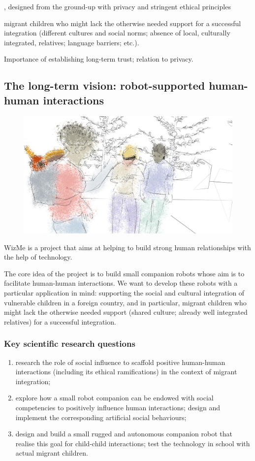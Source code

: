 \documentclass[]{article}
\newcommand{\project}{WizMe\xspace}
\begin{document}
, designed from the
ground-up with privacy and stringent ethical principles

migrant children who might lack the otherwise needed support for a successful
integration (different cultures and social norms; absence of local, culturally
integrated, relatives; language barriers; etc.).


Importance of establishing long-term trust; relation to privacy.


\subsection{The long-term vision: robot-supported human-human interactions}


\begin{figure}[!htbp]
    \centering
    \includegraphics[width=0.9\linewidth]{figs/render5-colors.png}
\end{figure}

\project is a project that aims at helping to build strong human
relationships with the help of technology.

The core idea of the project is to build small companion robots whose
aim is to facilitate human-human interactions. We want to develop these
robots with a particular application in mind: supporting the social and
cultural integration of vulnerable children in a foreign country, and in
particular, migrant children who might lack the otherwise needed support
(shared culture; already well integrated relatives) for a successful
integration.

\subsubsection{Key scientific research questions}

\begin{enumerate}
\item research the role of social influence to scaffold positive human-human
    interactions (including its ethical ramifications) in the context of migrant
    integration;
\item explore how a small robot companion can be endowed with social
    competencies to positively influence human interactions; design and
    implement the corresponding artificial social behaviours;
\item design and build a small rugged and autonomous companion robot that
    realise this goal for child-child interactions; test the technology in
    school with actual migrant children.
\end{enumerate}
\end{document}
